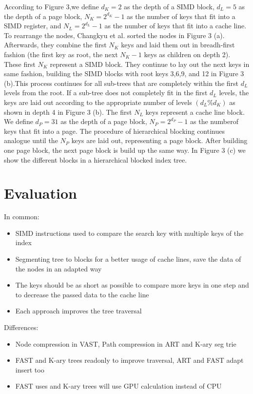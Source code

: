 \documentclass[conference]{IEEEtran}
\begin{document}
According to Figure 3,we define $d_K=2$ as the depth of a SIMD block, $d_L=5$ as the depth of a page block, $N_K=2^{d_K} -1$ as the number of keys that fit into a SIMD register, and $N_L = 2^{d_L} - 1$ as the number of keys that fit into a cache line. To rearrange the nodes, Changkyu et al. sorted the nodes in Figure 3 (a). Afterwards, they combine the first $N_K$ keys and laid them out in breadh-first fashion (the first key as root, the next $N_K - 1$ keys as children on depth 2). These first $N_K$ represent a SIMD block. They continue to lay out the next keys in same fashion, building the SIMD blocks with root keys 3,6,9, and 12 in Figure 3 (b).This
process continues for all sub-trees that are completely within the first $d_L$ levels from the root. If a sub-tree does not completely fit in the first $d_L$ levels, the keys are laid out according to the appropriate number of levels $(d_L \% d_K)$ as shown in depth 4 in Figure 3 (b). The first $N_L$ keys represent a cache line block. We define $d_P=31$ as the depth of a page block, $N_P=2^{d_P} -1$ as the numberof keys that fit into a page. The procedure of hierarchical blocking continues analogue until the $N_P$ keys are laid out, representing a page block. After building one page block, the next page block is build up the same way. In Figure 3 (c) we show the different blocks in a hierarchical blocked index tree.

\section{Evaluation}
In common:
\begin{itemize}
	\item SIMD instructions used to compare the search key with multiple keys of the index
	\item Segmenting tree to blocks for a better usage of cache lines, save the data of the nodes in an adapted way
	\item The keys should be as short as possible to compare more keys in one step and to decrease the passed data to the cache line
	\item Each approach improves the tree traversal
\end{itemize}

Differences:
\begin{itemize}
	\item Node compression in VAST, Path compression in ART and K-ary seg trie
	\item FAST and K-ary trees readonly to improve traversal, ART and FAST adapt insert too
	\item FAST uses and K-ary trees will use GPU calculation instead of CPU
\end{itemize}
\end{document}
